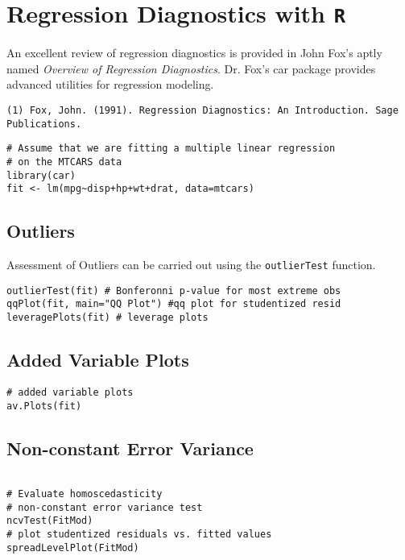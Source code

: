 \documentclass[12pt, a4paper]{article}
\theoremstyle{plain}
\theoremstyle{definition}
\theoremstyle{remark}
\begin{document}
\section{Regression Diagnostics with \texttt{R} }

An excellent review of regression diagnostics is provided in John Fox's aptly named \textit{Overview of Regression Diagnostics}. Dr. Fox's car package provides advanced utilities for regression modeling.

\begin{verbatim}
(1) Fox, John. (1991). Regression Diagnostics: An Introduction. Sage Publications.
\end{verbatim}

\begin{framed}
\begin{verbatim}
# Assume that we are fitting a multiple linear regression
# on the MTCARS data
library(car)
fit <- lm(mpg~disp+hp+wt+drat, data=mtcars)

\end{verbatim}
\end{framed}


\subsection{Outliers}

Assessment of Outliers can be carried out using the \texttt{outlierTest} function.

\begin{framed}
\begin{verbatim}
outlierTest(fit) # Bonferonni p-value for most extreme obs
qqPlot(fit, main="QQ Plot") #qq plot for studentized resid 
leveragePlots(fit) # leverage plots
\end{verbatim}
\end{framed}
\subsection{Added Variable Plots}
\begin{framed}
\begin{verbatim}
# added variable plots 
av.Plots(fit)
\end{verbatim}
\end{framed}

\subsection{Non-constant Error Variance}
\begin{framed}
\begin{verbatim}

# Evaluate homoscedasticity
# non-constant error variance test
ncvTest(FitMod)
# plot studentized residuals vs. fitted values 
spreadLevelPlot(FitMod)
\end{verbatim}
\end{framed}
\end{document}
